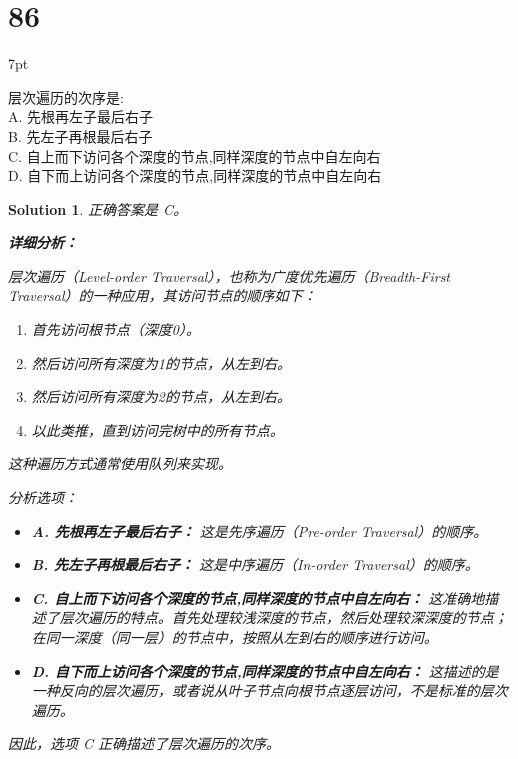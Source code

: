 \documentclass[UTF8]{report}
\newtheorem{solution}{Solution}
\theoremstyle{MyLineTheoremStyle} %
\theoremstyle{MyBlockTheoremStyle} %
\theoremstyle{MySubsubsectionStyle} %
\newenvironment{graybox}{%
        \def\FrameCommand{%
        \hspace{1pt}%
        {\color{gray}\small \vrule width 2pt}%
        {\color{graybox_color}\vrule width 4pt}%
        \colorbox{graybox_color}%
        }%
        \MakeFramed{\advance\hsize-\width\FrameRestore}%
        \noindent\hspace{-4.55pt}%
        \begin{adjustwidth}{}{7pt}%
        \vspace{2pt}\vspace{2pt}%
        }
        {%
        \vspace{2pt}\end{adjustwidth}\endMakeFramed%
        }
\begin{document}
\section*{86}
\begin{graybox}
层次遍历的次序是: \\
A. 先根再左子最后右子 \\
B. 先左子再根最后右子 \\
C. 自上而下访问各个深度的节点,同样深度的节点中自左向右 \\
D. 自下而上访问各个深度的节点,同样深度的节点中自左向右
\end{graybox}

\begin{solution}
正确答案是 C。

\textbf{详细分析：}

层次遍历（Level-order Traversal），也称为广度优先遍历（Breadth-First Traversal）的一种应用，其访问节点的顺序如下：
\begin{enumerate}
    \item 首先访问根节点（深度0）。
    \item 然后访问所有深度为1的节点，从左到右。
    \item 然后访问所有深度为2的节点，从左到右。
    \item 以此类推，直到访问完树中的所有节点。
\end{enumerate}
这种遍历方式通常使用队列来实现。

分析选项：
\begin{itemize}
    \item \textbf{A. 先根再左子最后右子：} 这是先序遍历（Pre-order Traversal）的顺序。
    \item \textbf{B. 先左子再根最后右子：} 这是中序遍历（In-order Traversal）的顺序。
    \item \textbf{C. 自上而下访问各个深度的节点,同样深度的节点中自左向右：} 这准确地描述了层次遍历的特点。首先处理较浅深度的节点，然后处理较深深度的节点；在同一深度（同一层）的节点中，按照从左到右的顺序进行访问。
    \item \textbf{D. 自下而上访问各个深度的节点,同样深度的节点中自左向右：} 这描述的是一种反向的层次遍历，或者说从叶子节点向根节点逐层访问，不是标准的层次遍历。
\end{itemize}

因此，选项 C 正确描述了层次遍历的次序。
\end{solution}
\end{document}
